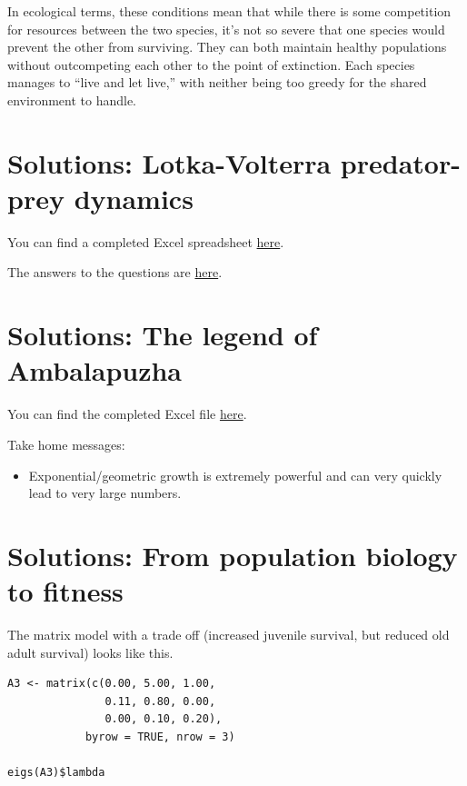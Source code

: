\documentclass[
  a4paper]{book}
\providecommand{\tightlist}{%
  \setlength{\itemsep}{0pt}\setlength{\parskip}{0pt}}
\begin{document}
In ecological terms, these conditions mean that while there is some competition for resources between the two species, it's not so severe that one species would prevent the other from surviving. They can both maintain healthy populations without outcompeting each other to the point of extinction. Each species manages to ``live and let live,'' with neither being too greedy for the shared environment to handle.

\section{Solutions: Lotka-Volterra predator-prey dynamics}\label{solutions-lotka-volterra-predator-prey-dynamics}

You can find a completed Excel spreadsheet \href{https://www.dropbox.com/s/wet7brtgxywdqi5/10.\%20Pred-PreyDynamics.xlsx?dl=1}{here}.

The answers to the questions are \href{https://www.dropbox.com/s/mt43nvqu7cjif69/10.\%20Answers\%20to\%20Pred-Prey\%20exercise.pdf?dl=1}{here}.

\section{Solutions: The legend of Ambalapuzha}\label{solutions-the-legend-of-ambalapuzha}

You can find the completed Excel file \href{https://www.dropbox.com/s/ybe5qhmfltuhoyv/RiceOnAChessboard_completed.xlsx?dl=1}{here}.

Take home messages:

\begin{itemize}
\tightlist
\item
  Exponential/geometric growth is extremely powerful and can very quickly lead to very large numbers.
\end{itemize}

\section{Solutions: From population biology to fitness}\label{solutions-from-population-biology-to-fitness}

The matrix model with a trade off (increased juvenile survival, but reduced old adult survival) looks like this.

\begin{verbatim}
A3 <- matrix(c(0.00, 5.00, 1.00, 
               0.11, 0.80, 0.00, 
               0.00, 0.10, 0.20), 
            byrow = TRUE, nrow = 3)

eigs(A3)$lambda
\end{verbatim}
\end{document}
